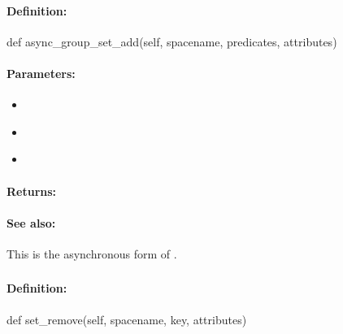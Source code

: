 \paragraph{Definition:}
\begin{pythoncode}
def async_group_set_add(self, spacename, predicates, attributes)
\end{pythoncode}

\paragraph{Parameters:}
\begin{itemize}[noitemsep]
\item {}\\

\item {}\\

\item {}\\

\end{itemize}

\paragraph{Returns:}


\paragraph{See also:}  This is the asynchronous form of .

\pagebreak
\subsubsection{}
\label{api:python:set_remove}


\paragraph{Definition:}
\begin{pythoncode}
def set_remove(self, spacename, key, attributes)
\end{pythoncode}

